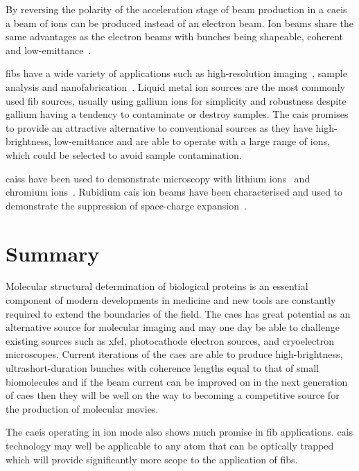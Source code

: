 By reversing the polarity of the acceleration stage of beam production in a \gls{caeis} a beam of ions can be produced instead of an electron beam.
Ion beams share the same advantages as the electron beams with bunches being shapeable, coherent and low-emittance~\cite{knuffman_cold_2013}.

\Glspl{fib} have a wide variety of applications such as high-resolution imaging~\cite{scipioni_helium_2008}, sample analysis and nanofabrication~\cite{khizroev_focused-ion-beam-based_2004}.
Liquid metal ion sources are the most commonly used \gls{fib} sources, usually using gallium ions for simplicity and robustness despite gallium having a tendency to contaminate or destroy samples.
The \gls{cais} promises to provide an attractive alternative to conventional sources as they have high-brightness, low-emittance and are able to operate with a large range of ions, which could be selected to avoid sample contamination.

\Glspl{cais} have been used to demonstrate microscopy with lithium ions~\cite{knuffman_nanoscale_2011} and chromium ions~\cite{steele_focused_2010}.
Rubidium \gls{cais} ion beams have been characterised and used to demonstrate the suppression of space-charge expansion~\cite{murphy_detailed_2014,thompson_suppression_2016}.

\section{Summary}

Molecular structural determination of biological proteins is an essential component of modern developments in medicine and new tools are constantly required to extend the boundaries of the field.
The \gls{caes} has great potential as an alternative source for molecular imaging and may one day be able to challenge existing sources such as \gls{xfel}, photocathode electron sources, and cryoelectron microscopes.
Current iterations of the \gls{caes} are able to produce high-brightness, ultrashort-duration bunches with coherence lengths equal to that of small biomolecules and if the beam current can be improved on in the next generation of \gls{caes} then they will be well on the way to becoming a competitive source for the production of molecular movies.

The \gls{caeis} operating in ion mode also shows much promise in \gls{fib} applications.
\Gls{cais} technology may well be applicable to any atom that can be optically trapped which will provide significantly more scope to the application of \glspl{fib}.

